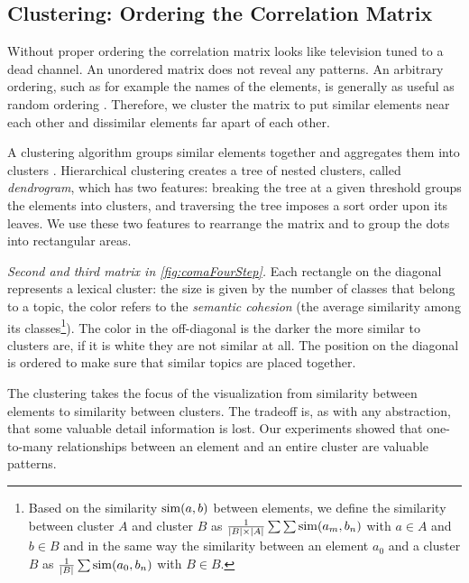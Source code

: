 \subsection{Clustering: Ordering the Correlation Matrix}\label{sec:clustering}


Without proper ordering the correlation matrix looks like television tuned to a dead channel. An unordered matrix does not reveal any patterns. An arbitrary ordering, such as for example the names of the elements, is generally as useful as random ordering \cite{Bert73a}. Therefore, we cluster the matrix to put similar elements near each other and dissimilar elements far apart of each other.

A clustering algorithm groups similar elements together and aggregates them into clusters \cite{Jain99a}. Hierarchical clustering creates a tree of nested clusters, called \emph{dendrogram}, which has two features: breaking the tree at a given threshold groups the elements into clusters, and traversing the tree imposes a sort order upon its leaves. We use these two features to rearrange the matrix and to group the dots into rectangular areas.

\emph{Second and third matrix in \autoref{fig:comaFourStep}.} Each rectangle on the diagonal represents a lexical cluster: the size is given by the number of classes that belong to a topic, the color refers to the \emph{semantic cohesion} \cite{Marc05a} (\ie the average similarity among its classes\footnote{Based on the similarity ${\rm sim}(a,b)$ between elements, we define the similarity between cluster $A$ and cluster $B$ as $\frac{1}{|B| \times |A|}\sum \sum {\rm sim}(a_m,b_n)$ with $a \in A$ and $b \in B$ and in the same way the similarity between an element $a_0$ and a cluster $B$ as $\frac{1}{|B|}\sum {\rm sim}(a_0,b_n)$ with $B \in B$.
}). The color in the off-diagonal is the darker the more similar to clusters are, if it is white they are not similar at all. The position on the diagonal is ordered to make sure that similar topics are placed together.

The clustering takes the focus of the visualization from similarity between elements to similarity between clusters. The tradeoff is, as with any abstraction, that some valuable detail information is lost. Our experiments showed that one-to-many relationships between an element and an entire cluster are valuable patterns.

